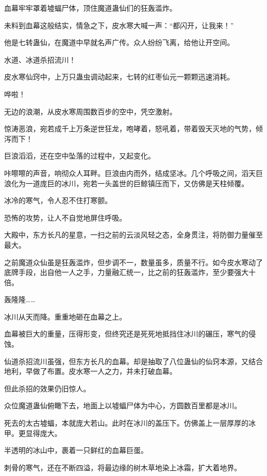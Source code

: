 
\begin{this_body}

血幕牢牢罩着墟蝠尸体，顶住魔道蛊仙们的狂轰滥炸。

未料到血幕这般结实，情急之下，皮水寒大喊一声：“都闪开，让我来！”

他是七转蛊仙，在魔道中早就名声广传。众人纷纷飞离，给他让开空间。

水道、冰道杀招流川！

皮水寒仙窍中，上万只蛊虫调动起来，七转的红枣仙元一颗颗迅速消耗。

哗啦！

无边的浪潮，从皮水寒周围数百步的空中，凭空激射。

惊涛恶浪，宛若成千上万条逆世狂龙，咆哮着，怒吼着，带着毁天灭地的气势，倾泻而下！

巨浪滔滔，还在空中坠落的过程中，又起变化。

咔嚓嚓的声音，响彻众人耳畔。巨浪由内而外，结成坚冰。几个呼吸之间，滔天巨浪化为一道庞巨的冰川，宛若一头盖世的巨鲸镇压而下，又仿佛是天柱倾覆。

冰冷的寒气，令人忍不住打寒颤。

恐怖的攻势，让人不自觉地屏住呼吸。

大殿中，东方长凡的星意，一扫之前的云淡风轻之态，全身贯注，将防御力量催至最大。

之前魔道众仙虽是狂轰滥炸，但步调不一，数量虽多，质量不行。如今皮水寒动了底牌手段，出自他一人之手，力量融汇统一，比之前的狂轰滥炸，至少要强大十倍。

轰隆隆……

冰川从天而降。重重地砸在血幕之上。

血幕被巨大的重量，压得形变，但终究还是死死地抵挡住冰川的碾压，寒气的侵蚀。

仙道杀招流川虽强，但东方长凡的血幕。却是抽取了八位蛊仙的仙窍本源，又结合地利，早做了布置。皮水寒一人之力，并未打破血幕。

但此杀招的效果仍旧惊人。

众位魔道蛊仙俯瞰下去，地面上以墟蝠尸体为中心，方圆数百里都是冰川。

死去的太古墟蝠，本就庞大若山。此时在冰川的盖压下。仿佛盖上一层厚厚的冰甲。更显得庞大。

半透明的冰山中，裹着一只鲜红的血幕巨蛋。

刺骨的寒气，还在不断四溢，将最边缘的树木草地染上冰霜，扩大着地界。


\end{this_body}
